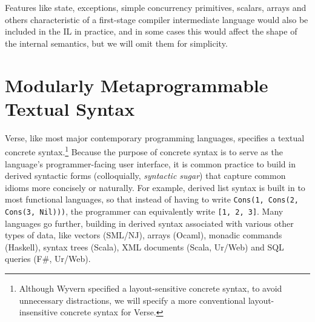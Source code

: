 Features like state, exceptions, simple concurrency primitives, scalars, arrays and others characteristic of a first-stage compiler intermediate language would also be included in the IL in practice, and in some cases this would affect the shape of the internal semantics, but we will omit them for simplicity. %


\section{Modularly Metaprogrammable Textual Syntax}\label{sec:syntax}
Verse, like most major contemporary programming languages, specifies a textual concrete syntax.\footnote{Although Wyvern specified a layout-sensitive concrete syntax, to avoid unnecessary distractions, we will specify a more conventional layout-insensitive concrete syntax for Verse.} %
Because the purpose of concrete syntax is to serve as the language's programmer-facing user interface, it is common practice to build in  derived syntactic forms (colloquially, \emph{syntactic sugar}) that capture common idioms more concisely or naturally. %
For example, derived list syntax is built in to most functional languages, so that instead of having to write \lstinline{Cons(1, Cons(2, Cons(3, Nil)))}, the programmer can equivalently write \lstinline{[1, 2, 3]}. Many languages go further, building in derived syntax associated with various other types of data, like vectors (SML/NJ), arrays (Ocaml), monadic commands (Haskell), syntax trees (Scala), XML documents (Scala, Ur/Web) and SQL queries (F\#, Ur/Web). %

